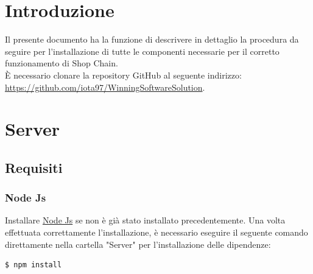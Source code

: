 \documentclass[a4paper, 12pt]{article}
\begin{document}
\makefrontpage
\tableofcontents
\newpage

\section{Introduzione}
\label{sec:intro}
Il presente documento ha la funzione di descrivere in dettaglio la procedura da seguire per l'installazione di tutte le componenti necessarie per il corretto funzionamento di Shop Chain.
\\È necessario clonare la repository GitHub al seguente indirizzo: \url{https://github.com/iota97/WinningSoftwareSolution}.
\section{Server}
\subsection{Requisiti}
\subsubsection{Node Js}
Installare \href{https://nodejs.org/en/download/}{Node Js} se non è già stato installato precedentemente. Una volta effettuata correttamente l'installazione, è necessario eseguire il seguente comando direttamente nella cartella "Server" per l'installazione delle dipendenze:
\begin{lstlisting}[language=bash]
  $ npm install
\end{lstlisting}
\end{document}
